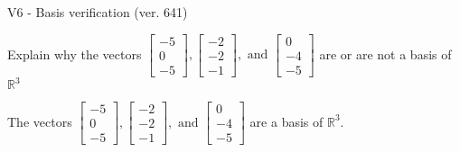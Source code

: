 \begin{exercise}
  \begin{exerciseTitle}V6 - Basis verification (ver. 641)\end{exerciseTitle}
  \begin{exerciseStatement}
    Explain why the vectors \(\left[\begin{array}{r}
-5 \\
0 \\
-5
\end{array}\right] , \left[\begin{array}{r}
-2 \\
-2 \\
-1
\end{array}\right] , \text{ and } \left[\begin{array}{r}
0 \\
-4 \\
-5
\end{array}\right]\) are or are not a basis of \(\mathbb{R}^3\)	


  \end{exerciseStatement}
  \begin{exerciseAnswer}
   The vectors \(\left[\begin{array}{r}
-5 \\
0 \\
-5
\end{array}\right] , \left[\begin{array}{r}
-2 \\
-2 \\
-1
\end{array}\right] , \text{ and } \left[\begin{array}{r}
0 \\
-4 \\
-5
\end{array}\right]\) 
  	 are  a basis of \(\mathbb{R}^3\).
  


  \end{exerciseAnswer}
\end{exercise}
